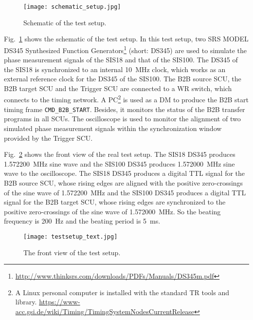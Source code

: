 \begin{figure}[H]
   \centering   
   \texttt{[image: schematic\_setup.jpg]}
   \caption{Schematic of the test setup.}
   \label{setup}
\end{figure}

Fig.~\ref{setup} shows the schematic of the test setup. In this test setup, two SRS MODEL DS345 Synthesized Function Generators\footnote{\url{http://www.thinksrs.com/downloads/PDFs/Manuals/DS345m.pdf}} (short: DS345) are used to simulate the phase measurement signals of the SIS18 and that of the SIS100. The DS345 of the SIS18 is synchronized to an internal \SI{10}{\MHz} clock, which works as an external reference clock for the DS345 of the SIS100. The B2B source SCU, the B2B target SCU and the Trigger SCU are connected to a WR switch, which connects to the timing network. A \gls{PC}\footnote{A Linux personal computer is installed with the standard TR tools and library. \newline\url{https://www-acc.gsi.de/wiki/Timing/TimingSystemNodesCurrentRelease}} is used as a DM to produce the B2B start timing frame \verb|CMD_B2B_START|. Besides, it monitors the status of the B2B transfer programs in all SCUs. The oscilloscope is used to monitor the alignment of two simulated phase measurement signals within the synchronization window provided by the Trigger SCU.   

Fig.~\ref{testsetup_text} shows the front view of the real test setup. The SIS18 DS345 produces \SI{1.572200}{\MHz} sine wave and the SIS100 DS345 produces \SI{1.572000}{\MHz} sine wave to the oscilloscope. The SIS18 DS345 produces a digital TTL signal for the B2B source SCU, whose rising edges are aligned with the positive zero-crossings of the sine wave of \SI{1.572200}{\MHz} and the SIS100 DS345 produces a digital TTL signal for the B2B target SCU, whose rising edges are synchronized to the positive zero-crossings of the sine wave of \SI{1.572000}{\MHz}. So the beating frequency is \SI{200}{\Hz} and the beating period is \SI{5}{\ms}. 
\begin{figure}[!htb]
   \centering   
   \texttt{[image: testsetup\_text.jpg]}
   \caption{The front view of the test setup.}
   \label{testsetup_text}
\end{figure}

